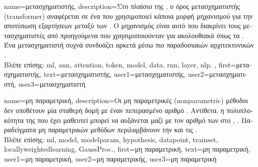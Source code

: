 {name={\foreignlanguage{greek}{μετασχηματιστής}},
	description={\foreignlanguage{greek}{Στο πλαίσιο της} , \foreignlanguage{greek}{ο όρος 
		μετασχηματιστής} (transformer) \foreignlanguage{greek}{αναφέρεται σε ένα} 
		 \foreignlanguage{greek}{που χρησιμοποιεί κάποια μορφή μηχανισμού}  \foreignlanguage{greek}{για 
		την αποτύπωση εξαρτήσεων μεταξύ των}  \cite{vaswani2017attention}. 
 		\foreignlanguage{greek}{Ο μηχανισμός}  \foreignlanguage{greek}{είναι αυτό που διακρίνει τους μετασχηματιστές από 
		προηγούμενα}  \foreignlanguage{greek}{που χρησιμοποιούνταν για ακολουθιακά}  
		\foreignlanguage{greek}{όπως τα} . \foreignlanguage{greek}{Ένα}  \foreignlanguage{greek}{μετασχηματιστή 
		συχνά συνδυάζει αρκετά}   \foreignlanguage{greek}{μέσω πιο παραδοσιακών 
		αρχιτεκτονικών} . 
		\\ 
		\foreignlanguage{greek}{Βλέπε επίσης:} \gls{ml}, \gls{ann}, \gls{attention}, \gls{token}, \gls{model}, \gls{data}, \gls{rnn}, \gls{layer}, \gls{nlp}. }, 
 	first={\foreignlanguage{greek}{μετασχηματιστής}}, 
 	text={\foreignlanguage{greek}{μετασχηματιστής}},
	user1={\foreignlanguage{greek}{μετασχηματιστής}}, %
	user2={\foreignlanguage{greek}{μετασχηματιστή}}, %
	user3={\foreignlanguage{greek}{μετασχηματιστή}} %
}

{name={\foreignlanguage{greek}{μη παραμετρική}}, 
	description={\foreignlanguage{greek}{Οι μη παραμετρικές} (nonparametric) 
		\foreignlanguage{greek}{μέθοδοι}  \foreignlanguage{greek}{δεν υποθέτουν μία σταθερή δομή}  
		 \foreignlanguage{greek}{με έναν πεπερασμένο αριθμό} . \foreignlanguage{greek}{Αντίθετα, 
		η πολυπλοκότητα της}  \foreignlanguage{greek}{που έχει μαθευτεί μπορεί να αυξάνεται μαζί με τον αριθμό των} 
		 \foreignlanguage{greek}{στο}  \cite{MLBasics}, \cite{BishopBook}. 
		\foreignlanguage{greek}{Παραδείγματα μη παραμετρικών μεθόδων}  \foreignlanguage{greek}{περιλαμβάνουν την} 
		 \foreignlanguage{greek}{και τις} . 
				\\
		\foreignlanguage{greek}{Βλέπε επίσης:} \gls{ml}, \gls{model}, \gls{modelparam}, \gls{hypothesis}, \gls{datapoint}, 
		\gls{trainset}, \gls{locallyweightedlearning}, \gls{GaussProc}.}, 
	first={\foreignlanguage{greek}{μη παραμετρική}},
	text={\foreignlanguage{greek}{μη παραμετρική}},
	user1={\foreignlanguage{greek}{μη παραμετρική}}, %
	user2={\foreignlanguage{greek}{μη παραμετρικής}}, %
	user3={\foreignlanguage{greek}{μη παραμετρική}} %
}


